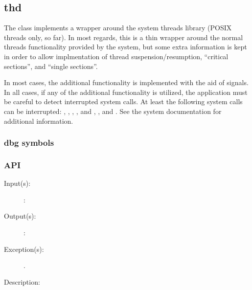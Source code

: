%
%
%
%
%              

\subsection{thd}
\label{thd}

The  class implements a wrapper around the system threads library
(POSIX threads only, so far).  In most regards, this is a thin wrapper around
the normal threads functionality provided by the system, but some extra
information is kept in order to allow implmentation of thread
suspension/resumption, ``critical sections'', and ``single sections''.

In most cases, the additional functionality is implemented with the aid of
signals.  In all cases, if any of the additional functionality is utilized, the
application must be careful to detect interrupted system calls.  At least the
following system calls can be interrupted: , ,
, ,  and ,
, and .  See the system documentation for
additional information.

\subsubsection{dbg symbols}

\subsubsection{API}
\begin{description}
\label{thd_}
\item[{\cfunc[]{thd\_}{}}: ]
	\begin{description}\item[]
	\item[Input(s): ]
		\begin{description}\item[]
		\item[: ]
		\end{description}
	\item[Output(s): ]
		\begin{description}\item[]
		\item[: ]
		\end{description}
	\item[Exception(s): ]
		\begin{description}\item[]
		\item[.]
		\end{description}
	\item[Description: ]
	\end{description}
\end{description}
